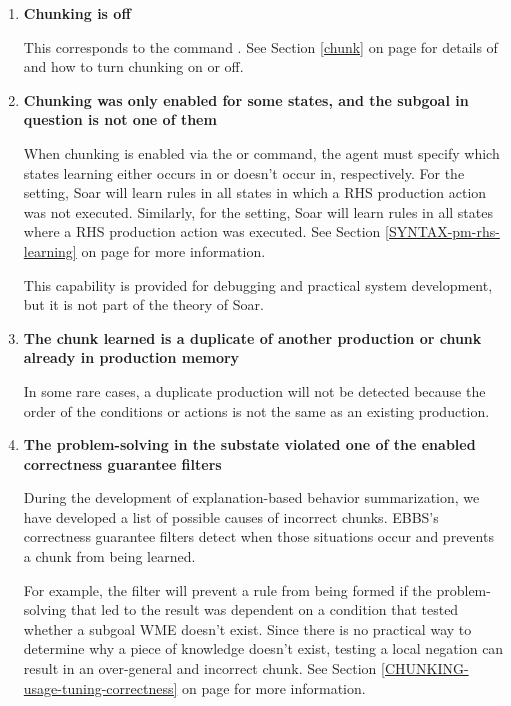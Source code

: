 \begin{enumerate}
	\item \textbf{Chunking is off}

	This corresponds to the command .  See Section \ref{chunk} on page \pageref{chunk} for details of  and how to turn chunking on or off.

	\item \textbf{Chunking was only enabled for some states, and the subgoal in question is not one of them}

	When chunking is enabled via the  or  command, the agent must specify which states learning either occurs in or doesn't occur in, respectively.  For the  setting, Soar will learn rules in all states in which a  RHS production action was not executed.  Similarly, for the  setting, Soar will learn rules in all states where a  RHS production action was executed.  See Section \ref{SYNTAX-pm-rhs-learning} on page \pageref{SYNTAX-pm-rhs-learning} for more information.

	This capability is provided for debugging and practical system development, but it is not part of the theory of Soar.

	\item \textbf{The chunk learned is a duplicate of another production or chunk already in production memory}

	In some rare cases, a duplicate production will not be detected because the order of the conditions or actions is not the same as an existing production.

	\item \textbf{The problem-solving in the substate violated one of the enabled correctness guarantee filters}

	During the development of explanation-based behavior summarization, we have developed a list of possible causes of incorrect chunks. EBBS's correctness guarantee filters detect when those situations occur and prevents a chunk from being learned.

	For example, the  filter will prevent a rule from being formed if the problem-solving that led to the result was dependent on a condition that tested whether a subgoal WME doesn't exist.  Since there is no practical way to determine why a piece of knowledge doesn't exist, testing a local negation can result in an over-general and incorrect chunk.  See Section \ref{CHUNKING-usage-tuning-correctness} on page \pageref{CHUNKING-usage-tuning-correctness} for more information.


\end{enumerate}
